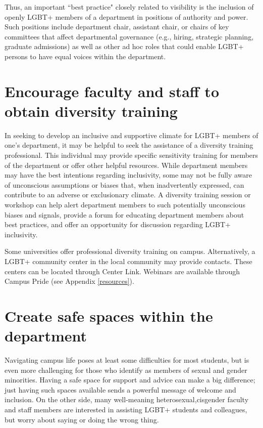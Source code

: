 Thus, an important ``best practice" closely related to visibility is the inclusion of openly LGBT+ members of a department in positions of authority and power. Such positions include department chair, assistant chair, or chairs of key committees that affect departmental governance (e.g., hiring, strategic planning, graduate admissions) as well as other ad hoc roles that could enable LGBT+ persons to have equal voices within the department.


\section {Encourage faculty and staff to obtain diversity training}
\label{diversity-training}
In seeking to develop an inclusive and supportive climate for LGBT+ members of one's department, it may be helpful to seek the assistance of a diversity training professional. This individual may provide specific sensitivity training for members of the department or offer other helpful resources. While department members may have the best intentions regarding inclusivity, some may not be fully aware of unconscious assumptions or biases that, when inadvertently expressed, can contribute to an adverse or exclusionary climate. A diversity training session or workshop can help alert department members to such potentially unconscious biases and signals, provide a forum for educating department members about best practices, and offer an opportunity for discussion regarding LGBT+ inclusivity.

Some universities offer professional diversity training on campus. Alternatively, a LGBT+ community center in the local community may provide contacts. These centers can be located through Center Link. Webinars are available through Campus Pride (see Appendix \ref{resources}).

\newpage
\section {Create safe spaces within the department}
\label{safe-spaces}
Navigating campus life poses at least some difficulties for most students, but is even more challenging for those who identify as members of sexual and gender minorities. Having a safe space for support and advice can make a big difference; just having such spaces available sends a powerful message of welcome and inclusion. On the other side, many well-meaning heterosexual,cisgender faculty and staff members are interested in assisting LGBT+ students and colleagues, but worry about saying or doing the wrong thing.

